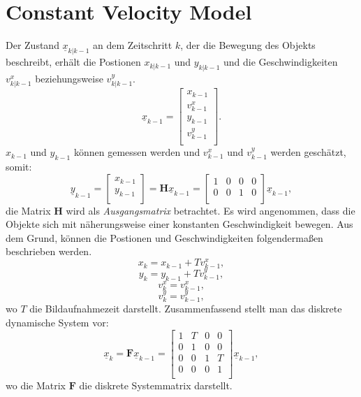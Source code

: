 \documentclass[10pt,a4paper]{article}
\begin{document}
\section{Constant Velocity Model}
Der Zustand  $\underline{x}_{k|k-1}$ an dem Zeitschritt $k$, der die Bewegung des Objekts beschreibt, erhält die Postionen $x_{k|k-1}$ und $y_{k|k-1}$ und die Geschwindigkeiten $v^x_{k|k-1}$ beziehungsweise $v^y_{k|k-1}$.
\begin{equation}
\underline{x}_{k-1} = \begin{bmatrix}
x_{k-1} \\
v^x_{k-1}\\
y_{k-1}\\
v^y_{k-1}\\
\end{bmatrix}.
\end{equation}
$x_{k-1}$ und $y_{k-1}$ können gemessen werden und $v^x_{k-1}$ und $v^y_{k-1}$ werden geschätzt, somit:
\begin{equation}
\underline{y}_{k-1} = \begin{bmatrix}
x_{k-1} \\
y_{k-1}\\
\end{bmatrix} =\textbf{H}\underline{x}_{k-1} =
\begin{bmatrix}
1 & 0 &0 &0 \\
0 & 0 &1 &0\\
\end{bmatrix}\underline{x}_{k-1},
\end{equation}
die Matrix $\textbf{H}$ wird als \textit{Ausgangsmatrix} betrachtet. Es wird angenommen, dass die Objekte sich mit näherungsweise einer konstanten Geschwindigkeit bewegen. Aus dem Grund, können die Postionen und Geschwindigkeiten folgendermaßen beschrieben werden.
\begin{equation}
x_{k} = x_{k-1} + Tv^x_{k-1},
\end{equation}
\begin{equation*}
y_{k} = y_{k-1} + Tv^y_{k-1},
\end{equation*}
\begin{equation*}
v^x_{k} = v^x_{k-1},
\end{equation*}
\begin{equation*}
v^y_{k} = v^y_{k-1},
\end{equation*}
wo $T$ die Bildaufnahmezeit darstellt. Zusammenfassend stellt man das diskrete dynamische System vor:
\begin{equation}
\underline{x}_{k} = \textbf{F}\underline{x}_{k-1} = 
\begin{bmatrix}
1 & T &0 &0 \\
0 & 1 &0 &0 \\
0 & 0 &1 &T\\
0 & 0 &0 &1 \\
\end{bmatrix}\underline{x}_{k-1},
\end{equation}
wo die Matrix $\textbf{F}$ die diskrete Systemmatrix darstellt.
\end{document}
